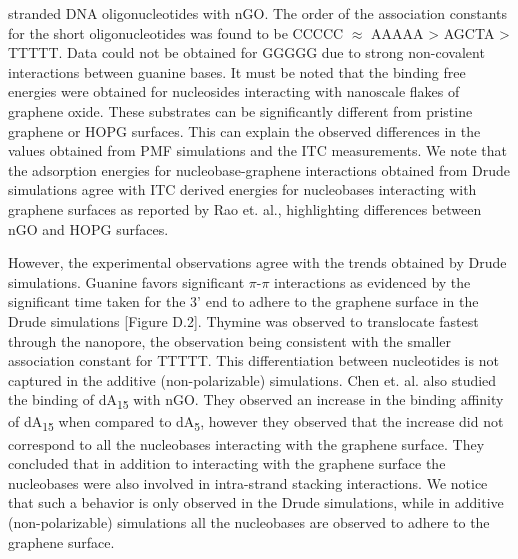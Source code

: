 stranded DNA oligonucleotides with nGO.\supercite{ranganathan_complex_2016} The order of the association constants for the short oligonucleotides was found to be CCCCC $\approx$ AAAAA > AGCTA > TTTTT. Data could not be obtained for GGGGG due to strong non-covalent interactions between guanine bases. It must be noted that the binding free energies were obtained for nucleosides interacting with nanoscale flakes of graphene oxide. These substrates can be significantly different from pristine graphene or HOPG surfaces. This can explain the observed differences in the values obtained from PMF simulations and the ITC measurements. We note that the adsorption energies for nucleobase-graphene interactions obtained from Drude simulations agree with ITC derived energies for nucleobases interacting with graphene surfaces as reported by Rao et. al.\supercite{varghese_binding_2009}, highlighting differences between nGO and HOPG surfaces. 

However, the experimental observations agree with the trends obtained by Drude simulations. Guanine favors significant $\pi$-$\pi$ interactions as evidenced by the significant time taken for the 3’ end to adhere to the graphene surface in the Drude simulations [Figure D.2]. Thymine was observed to translocate fastest through the nanopore, the observation being consistent with the smaller association constant for TTTTT. This differentiation between nucleotides is not captured in the additive (non-polarizable) simulations. Chen et. al. also studied the binding of dA\textsubscript{15} with nGO.\supercite{ranganathan_complex_2016} They observed an increase in the binding affinity of dA\textsubscript{15} when compared to dA\textsubscript{5}, however they observed that the increase did not correspond to all the nucleobases interacting with the graphene surface. They concluded that in addition to interacting with the graphene surface the nucleobases were also involved in intra-strand stacking interactions. We notice that such a behavior is only observed in the Drude simulations, while in additive (non-polarizable) simulations all the nucleobases are observed to adhere to the graphene surface.

